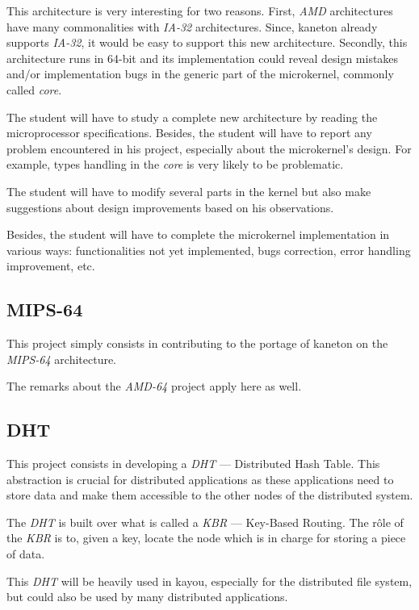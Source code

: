 \begin{multicols}{2}
This architecture is very interesting for two reasons. First, \textit{AMD}
architectures have many commonalities with \textit{IA-32} architectures. Since,
kaneton already supports \textit{IA-32}, it would be easy to support this new
architecture. Secondly, this architecture runs in 64-bit and its implementation
could reveal design mistakes and/or implementation bugs in the generic
part of the microkernel, commonly called \textit{core}.

The student will have to study a complete new architecture by reading the
microprocessor specifications. Besides, the student will have to report
any problem encountered in his project, especially about the microkernel's
design. For example, types handling in the \textit{core} is very likely to
be problematic.

The student will have to modify several parts in the kernel but also
make suggestions about design improvements based on his observations.

Besides, the student will have to complete the microkernel implementation
in various ways: functionalities not yet implemented, bugs correction, error
handling improvement, etc.

%
%

\subsection{MIPS-64}

This project simply consists in contributing to the portage of kaneton
on the \textit{MIPS-64} architecture.

The remarks about the \textit{AMD-64} project apply here as well.

%
%

\subsection{DHT}

This project consists in developing a \textit{DHT} --- Distributed Hash Table.
This abstraction is crucial for distributed applications as these applications
need to store data and make them accessible to the other nodes of the
distributed system.

The \textit{DHT} is built over what is called a \textit{KBR} --- Key-Based
Routing. The r\^ole of the \textit{KBR} is to, given a key, locate the
node which is in charge for storing a piece of data.

This \textit{DHT} will be heavily used in kayou, especially for the distributed
file system, but could also be used by many distributed applications.


\end{multicols}
